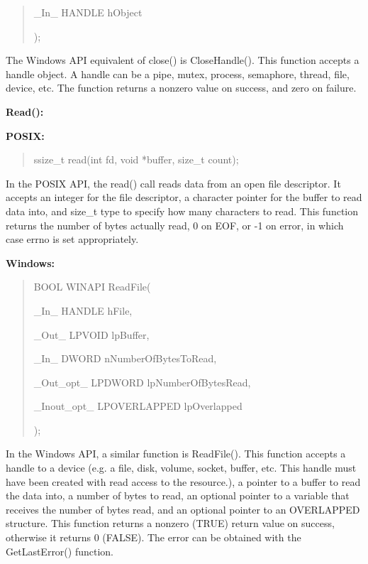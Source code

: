 \documentclass[letterpaper,10pt,titlepage]{article}
\newcommand{\ignore}[2]{\hspace{0in}#2} %
\newcommand{\tab}{\hspace*{2em}} %
\begin{document}
\begin{enumerate}
\begin{quote}
\tab\_In\_  HANDLE hObject

);
\end{quote}

\tab The Windows API equivalent of close() is CloseHandle(). This function accepts a handle object. A handle can be a pipe, mutex, process, semaphore, thread, file, device, etc. The function returns a nonzero value on success, and zero on failure. \newline 

\textbf{Read():}

\textbf{POSIX:} 

\begin{quote}
ssize\_t read(int fd, void *buffer, size\_t count);
\end{quote}

\tab In the POSIX API, the read() call reads data from an open file descriptor. It accepts an integer for the file descriptor, a character pointer for the buffer to read data into, and size\_t type to specify how many characters to read. This function returns the number of bytes actually read, 0 on EOF, or -1 on error, in which case errno is set appropriately.\newline

\textbf{Windows:} 

\begin{quote}
BOOL WINAPI ReadFile(

\tab\_In\_         HANDLE hFile,

\tab\_Out\_        LPVOID lpBuffer,

\tab\_In\_         DWORD nNumberOfBytesToRead,

\tab\_Out\_opt\_    LPDWORD lpNumberOfBytesRead,

\tab\_Inout\_opt\_  LPOVERLAPPED lpOverlapped

);
\end{quote}


\tab In the Windows API, a similar function is ReadFile(). This function accepts a handle to a device (e.g. a file, disk, volume, socket, buffer, etc. This handle must have been created with read access to the resource.), a pointer to a buffer to read the data into, a number of bytes to read, an optional pointer to a variable that receives the number of bytes read, and an optional pointer to an OVERLAPPED structure. \ignore{\[http://msdn.microsoft.com/en-us/library/windows/desktop/aa365467(v=vs.85).aspx\]}This function returns a nonzero (TRUE) return value on success, otherwise it returns 0 (FALSE). The error can be obtained with the GetLastError() function.\newline



\end{enumerate}
\end{document}

